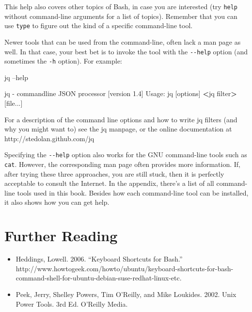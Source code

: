 \documentclass[
]{book}
\newenvironment{Shaded}{\begin{snugshade}}{\end{snugshade}}
\newcommand{\ExtensionTok}[1]{#1}
\newcommand{\NormalTok}[1]{#1}
\newcommand{\OperatorTok}[1]{\textcolor[rgb]{0.81,0.36,0.00}{\textbf{#1}}}
\providecommand{\tightlist}{%
  \setlength{\itemsep}{0pt}\setlength{\parskip}{0pt}}
\theoremstyle{definition}
\theoremstyle{definition}
\theoremstyle{definition}
\theoremstyle{remark}
\begin{document}
This help also covers other topics of Bash, in case you are interested (try \texttt{help} without command-line arguments for a list of topics). Remember that you can use \texttt{type} to figure out the kind of a specific command-line tool.

Newer tools that can be used from the command-line, often lack a man page as well. In that case, your best bet is to invoke the tool with the \texttt{-\/-help} option (and sometimes the \texttt{-h} option). For example:

\begin{Shaded}
\begin{Highlighting}[]
\ExtensionTok{jq}\NormalTok{ --help}

\ExtensionTok{jq}\NormalTok{ - commandline JSON processor [version 1.4]}
\ExtensionTok{Usage}\NormalTok{: jq [options] }\OperatorTok{<}\NormalTok{jq filter}\OperatorTok{>}\NormalTok{ [file...]}

\ExtensionTok{For}\NormalTok{ a description of the command line options and}
\ExtensionTok{how}\NormalTok{ to write jq filters (and why you might want to)}
\ExtensionTok{see}\NormalTok{ the jq manpage, or the online documentation at}
\ExtensionTok{http}\NormalTok{://stedolan.github.com/jq}
\end{Highlighting}
\end{Shaded}

Specifying the \texttt{-\/-help} option also works for the GNU command-line tools such as \texttt{cat}. However, the corresponding man page often provides more information. If, after trying these three approaches, you are still stuck, then it is perfectly acceptable to consult the Internet. In the appendix, there's a list of all command-line tools used in this book. Besides how each command-line tool can be installed, it also shows how you can get help.

\hypertarget{further-reading}{%
\section{Further Reading}\label{further-reading}}

\begin{itemize}
\tightlist
\item
  Heddings, Lowell. 2006. ``Keyboard Shortcuts for Bash.'' http://www.howtogeek.com/howto/ubuntu/keyboard-shortcuts-for-bash-command-shell-for-ubuntu-debian-suse-redhat-linux-etc.
\item
  Peek, Jerry, Shelley Powers, Tim O'Reilly, and Mike Loukides. 2002. Unix Power Tools. 3rd Ed. O'Reilly Media.
\end{itemize}
\end{document}
